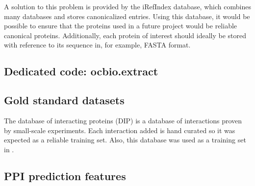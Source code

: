 A solution to this problem is provided by the iRefIndex\autocite{razick_irefindex_2008} database, which combines many databases and stores canonicalized entries.
Using this database, it would be possible to ensure that the proteins used in a future project would be reliable canonical proteins.
Additionally, each protein of interest should ideally be stored with reference to its sequence in, for example, FASTA format.

\subsection{Dedicated code: ocbio.extract}




\subsection{Gold standard datasets}


The database of interacting proteins (DIP) is a database of interactions proven by small-scale experiments\autocite{xenarios_dip_2002}.
Each interaction added is hand curated so it was expected as a reliable training set.
Also, this database was used as a training set in \textcite{qi_evaluation_2006}.






\subsection{PPI prediction features}



